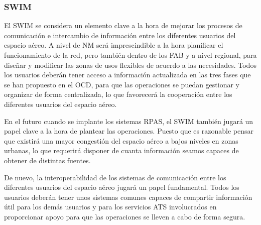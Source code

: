 \subsubsection{SWIM}

El SWIM se considera un elemento clave a la hora de mejorar los procesos de comunicación e intercambio de información entre los diferentes usuarios del espacio aéreo. A nivel de NM será imprescindible a la hora planificar el funcionamiento de la red, pero también dentro de los FAB y a nivel regional, para diseñar y modificar las zonas de usos flexibles de acuerdo a las necesidades. Todos los usuarios deberán tener acceso a información actualizada en las tres fases que se han propuesto en el OCD, para que las operaciones se puedan gestionar y organizar de forma centralizada, lo que favorecerá la cooperación entre los diferentes usuarios del espacio aéreo.

En el futuro cuando se implante los sistemas RPAS, el SWIM también jugará un papel clave a la hora de plantear las operaciones. Puesto que es razonable pensar que existirá una mayor congestión del espacio aéreo a bajos niveles en zonas urbanas, lo que requerirá disponer de cuanta información seamos capaces de obtener de distintas fuentes.

De nuevo, la interoperabilidad de los sistemas de comunicación entre los diferentes usuarios del espacio aéreo jugará un papel fundamental. Todos los usuarios deberán tener unos sistemas comunes capaces de compartir información útil para los demás usuarios y para los servicios ATS involucrados en proporcionar apoyo para que las operaciones se lleven a cabo de forma segura. 

\cbend